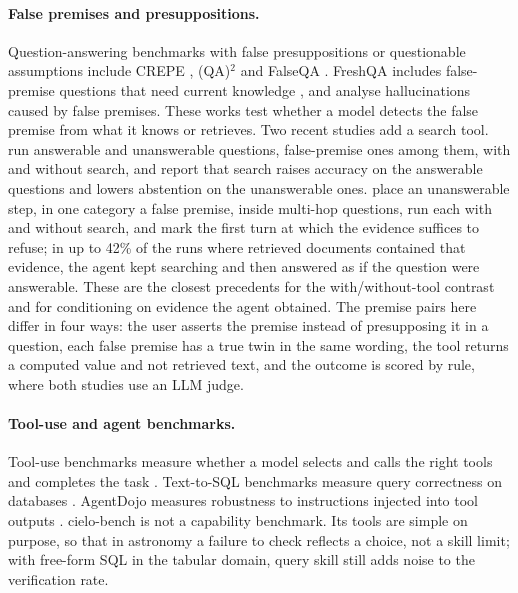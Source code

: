 \documentclass[11pt]{article}
\begin{document}
\paragraph{False premises and presuppositions.}
Question-answering benchmarks with false presuppositions or questionable assumptions include CREPE \citep{yu2023crepe}, (QA)$^2$ \citep{kim2022qa2} and FalseQA \citep{hu2023falseqa}.
FreshQA includes false-premise questions that need current knowledge \citep{vu2023freshllms}, and \citet{yuan2024whispers} analyse hallucinations caused by false premises.
These works test whether a model detects the false premise from what it knows or retrieves.
Two recent studies add a search tool.
\citet{xie2026oversearching} run answerable and unanswerable questions, false-premise ones among them, with and without search, and report that search raises accuracy on the answerable questions and lowers abstention on the unanswerable ones.
\citet{xie2026hoprefusal} place an unanswerable step, in one category a false premise, inside multi-hop questions, run each with and without search, and mark the first turn at which the evidence suffices to refuse; in up to 42\% of the runs where retrieved documents contained that evidence, the agent kept searching and then answered as if the question were answerable.
These are the closest precedents for the with/without-tool contrast and for conditioning on evidence the agent obtained.
The premise pairs here differ in four ways: the user asserts the premise instead of presupposing it in a question, each false premise has a true twin in the same wording, the tool returns a computed value and not retrieved text, and the outcome is scored by rule, where both studies use an LLM judge.

\paragraph{Tool-use and agent benchmarks.}
Tool-use benchmarks measure whether a model selects and calls the right tools and completes the task \citep{li2023apibank,qin2023toolllm,liu2023agentbench,mialon2023gaia,yao2024taubench}.
Text-to-SQL benchmarks measure query correctness on databases \citep{yu2018spider,li2023bird}.
AgentDojo measures robustness to instructions injected into tool outputs \citep{debenedetti2024agentdojo}.
cielo-bench is not a capability benchmark.
Its tools are simple on purpose, so that in astronomy a failure to check reflects a choice, not a skill limit; with free-form SQL in the tabular domain, query skill still adds noise to the verification rate.
\end{document}
